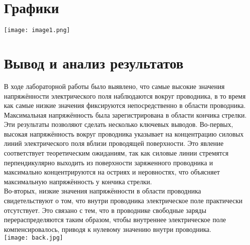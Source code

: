 \documentclass[12pt]{extarticle}
\begin{document}
    \section{Графики}
    \texttt{[image: image1.png]}

    \section{Вывод и анализ результатов}
    В ходе лабораторной работы было выявлено, что самые высокие значения напряжённости электрического поля наблюдаются вокруг проводника, в то время как самые низкие значения фиксируются непосредственно в области проводника. Максимальная напряжённость была зарегистрирована в области кончика стрелки.\\
Эти результаты позволяют сделать несколько ключевых выводов. Во-первых, высокая напряжённость вокруг проводника указывает на концентрацию силовых линий электрического поля вблизи проводящей поверхности. Это явление соответствует теоретическим ожиданиям, так как силовые линии стремятся перпендикулярно выходить из поверхности заряженного проводника и максимально концентрируются на остриях и неровностях, что объясняет максимальную напряжённость у кончика стрелки.\\
Во-вторых, низкие значения напряжённости в области проводника свидетельствуют о том, что внутри проводника электрическое поле практически отсутствует. Это связано с тем, что в проводнике свободные заряды перераспределяются таким образом, чтобы внутреннее электрическое поле компенсировалось, приводя к нулевому значению внутри проводника.\\

    \newpage
    \texttt{[image: back.jpg]}
    
\end{document}
